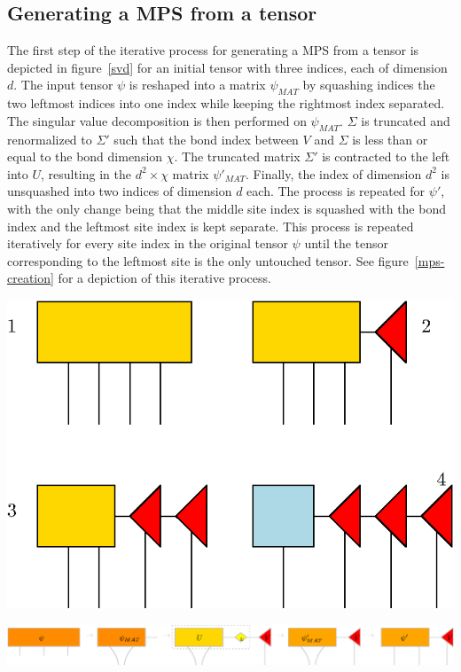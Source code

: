 \documentclass[12pt]{article}
\newenvironment{Figure}
  {\par\medskip\noindent\minipage{\linewidth}}
  {\endminipage\par\medskip}
\begin{document}
\begin{multicols}{2}
	\subsection*{Generating a MPS from a tensor}
	The first step of the iterative process for generating a MPS from a
	tensor is depicted in figure~\ref{svd} for an initial tensor with
	three indices, each of dimension $d$. The input tensor $\psi$ is
	reshaped into a matrix $\psi_{MAT}$ by squashing indices the two
	leftmost indices into one index while keeping the rightmost index
	separated. The singular value decomposition is then performed on
	$\psi_{MAT}$. $\Sigma$ is truncated and renormalized to $\Sigma'$
	such that the bond index between $V$ and $\Sigma$ is less than or
	equal to the bond dimension $\chi$. The truncated matrix $\Sigma'$
	is contracted to the left into $U$, resulting in the $d^2\times\chi$
	matrix $\psi'_{MAT}$. Finally, the index of dimension $d^2$ is
	unsquashed into two indices of dimension $d$ each. The process is
	repeated for $\psi'$, with the only change being that the middle
	site index is squashed with the bond index and the leftmost site
	index is kept separate. This process is repeated iteratively for
	every site index in the original tensor $\psi$ until the tensor
	corresponding to the leftmost site is the only untouched tensor.
	See figure~\ref{mps-creation} for a depiction of this iterative
	process.
	\begin{Figure}
		\center\includegraphics[width=.7\textwidth]{./Figures/mps-creation.eps}
		\label{mps-creation}
	\end{Figure}
	\end{multicols}
	\begin{Figure}
		\center\includegraphics[width=.9\textwidth]{./Figures/svd.eps}
		\label{svd}
	\end{Figure}
\end{document}
